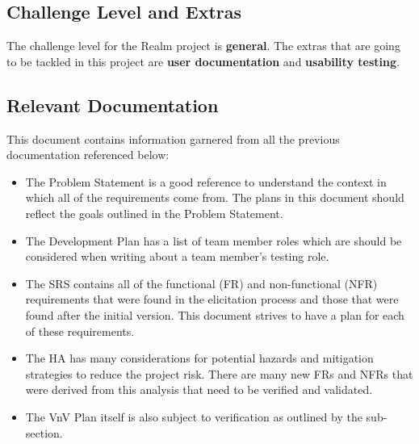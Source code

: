 \documentclass[12pt, titlepage]{article}
\begin{document}


\subsection{Challenge Level and Extras}

The challenge level for the Realm project is \textbf{general}. The extras that are going to be tackled in this project are \textbf{user documentation} and \textbf{usability testing}.

\subsection{Relevant Documentation}

This document contains information garnered from all the previous documentation referenced below:

\begingroup
    \raggedright
    \renewcommand{\refname}{}
    \vspace{-3em}
    \printbibliography
\endgroup

\begin{itemize}
    \item The Problem Statement \cite{ProblemStatement} is a good reference to understand the context in which all of the requirements come from. The plans in this document should reflect the goals outlined in the Problem Statement.
    \item The Development Plan \cite{DevelopmentPlan} has a list of team member roles which are should be considered when writing about a team member's testing role.
    \item The SRS \cite{SRS} contains all of the functional (FR) and non-functional (NFR) requirements that were found in the elicitation process and those that were found after the initial version. This document strives to have a plan for each of these requirements.
    \item The HA \cite{HA} has many considerations for potential hazards and mitigation strategies to reduce the project risk. There are many new FRs and NFRs that were derived from this analysis that need to be verified and validated.
    \item The VnV Plan \cite{VnV} itself is also subject to verification as outlined by the  sub-section.
\end{itemize}
\end{document}
